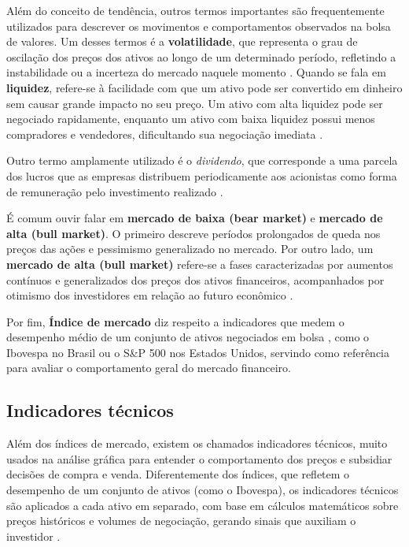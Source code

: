 Além do conceito de tendência, outros termos importantes são frequentemente utilizados para descrever os movimentos e comportamentos observados na bolsa de valores. Um desses termos é a \textbf{volatilidade}, que representa o grau de oscilação dos preços dos ativos ao longo de um determinado período, refletindo a instabilidade ou a incerteza do mercado naquele momento \cite{MishkinEakins2018}. Quando se fala em \textbf{liquidez}, refere-se à facilidade com que um ativo pode ser convertido em dinheiro sem causar grande impacto no seu preço. Um ativo com alta liquidez pode ser negociado rapidamente, enquanto um ativo com baixa liquidez possui menos compradores e vendedores, dificultando sua negociação imediata \cite{FabozziModigliani2009}.

Outro termo amplamente utilizado é o \emph{dividendo}, que corresponde a uma parcela dos lucros que as empresas distribuem periodicamente aos acionistas como forma de remuneração pelo investimento realizado \cite{Lei6404,BodieKaneMarcus2021}.

É comum ouvir falar em \textbf{mercado de baixa (bear market)} e \textbf{mercado de alta (bull market)}. O primeiro descreve períodos prolongados de queda nos preços das ações e pessimismo generalizado no mercado. Por outro lado, um \textbf{mercado de alta (bull market)} refere-se a fases caracterizadas por aumentos contínuos e generalizados dos preços dos ativos financeiros, acompanhados por otimismo dos investidores em relação ao futuro econômico \cite{BodieKaneMarcus2021}.


Por fim, \textbf{Índice de mercado} diz respeito a indicadores que medem o desempenho médio de um conjunto de ativos negociados em bolsa \cite{Daycoval}, como o Ibovespa no Brasil ou o S\&P 500 nos Estados Unidos, servindo como referência para avaliar o comportamento geral do mercado financeiro.


\subsection{Indicadores técnicos}

Além dos índices de mercado, existem os chamados indicadores técnicos, muito usados na análise gráfica para entender o comportamento dos preços e subsidiar decisões de compra e venda. Diferentemente dos índices, que refletem o desempenho de um conjunto de ativos (como o Ibovespa), os indicadores técnicos são aplicados a cada ativo em separado, com base em cálculos matemáticos sobre preços históricos e volumes de negociação, gerando sinais que auxiliam o investidor \cite{Murphy1999}.

